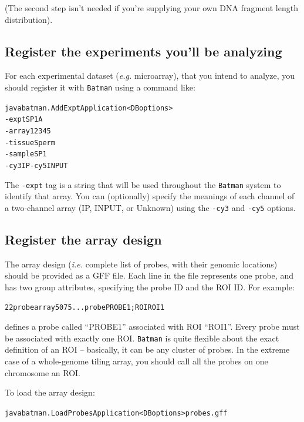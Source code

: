\documentclass[a4paper, 11pt]{article}
\newcommand{\bm}{{\tt Batman}\xspace}
\begin{document}
(The second step isn't needed if you're supplying your own DNA fragment length
distribution).

\subsection{Register the experiments you'll be analyzing}

For each experimental dataset ({\it e.g.} microarray), that you intend to analyze,
you should register it with {\tt Batman} using a command like:

\begin{alltt}java batman.AddExptApplication <DB options>
                    -expt SP1A
                    -array 12345
                    -tissue Sperm
                    -sample SP1
                    -cy3 IP -cy5 INPUT\end{alltt}

The {\tt -expt} tag is a string that will be used throughout the {\tt Batman}
system to identify that array.  You can (optionally) specify the meanings of
each channel of a two-channel array (IP, INPUT, or Unknown) using the {\tt -cy3}
and {\tt -cy5} options.

\subsection{Register the array design}

The array design ({\it i.e.} complete list of probes, with their genomic locations)
should be provided as a GFF file.  Each line in the file represents one probe,
and has two group attributes, specifying the probe ID and the ROI ID.  For example:

\begin{alltt}22  probe   array   50  75  .   .   .   probe PROBE1; ROI ROI1\end{alltt}

defines a probe called ``PROBE1'' associated with ROI ``ROI1''.  Every probe must be
associated with exactly one ROI.  \bm is quite flexible about the exact definition of
an ROI -- basically, it can be any cluster of probes.  In the extreme case of a whole-genome
tiling array, you should call all the probes on one chromosome an ROI.

To load the array design:

\begin{alltt}    java batman.LoadProbesApplication <DB options> probes.gff\end{alltt}
\end{document}
